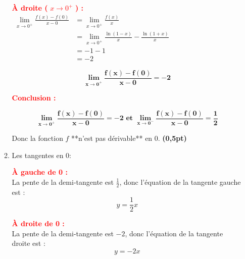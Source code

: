 \documentclass[12pt,a4paper]{article}
\begin{document}
\begin{enumerate}
\begin{enumerate}
                    \textcolor{red}{\textbf{À droite (} \( x \to 0^+ \) \textbf{) :}}\\

                    \(
                    \begin{aligned}
                        \lim\limits_{x \to 0^+} \frac{f(x)-f(0)}{x-0} & = \lim\limits_{x \to 0^+} \frac{f(x)}{x}                             \\
                                                                      & = \lim\limits_{x \to 0^+}\frac{\ln(1 - x)}{x} - \frac{\ln(1 + x)}{x} \\
                                                                      & =-1-1                                                                \\
                                                                      & =-2
                    \end{aligned}
                    \)

                    \begin{resultbox}
                        \[
                            \mathbf{\lim\limits_{x \to 0^+} \frac{f(x)-f(0)}{x-0}=-2}
                        \]
                    \end{resultbox}

                    \textcolor{red}{\textbf{Conclusion :}}\\

                    \begin{resultbox}
                        \[
                            \mathbf{\lim\limits_{x \to 0^+} \frac{f(x)-f(0)}{x-0}=-2 \text{ et } \lim\limits_{x \to 0^-} \frac{f(x)-f(0)}{x-0}=\frac{1}{2}}
                        \]
                    \end{resultbox}

                    Donc la fonction \( f \) **n’est pas dérivable** en 0. \hfill \textbf{(0,5pt)}

              \item Les tangentes en $0$:
              
                    \textcolor{red}{\textbf{À gauche de 0 :}}\\
                    La pente de la demi-tangente est \( \frac{1}{2} \), donc l'équation de la tangente gauche est :
                    \[
                        y = \frac{1}{2}x
                    \]

                    \textcolor{red}{\textbf{À droite de 0 :}}\\
                    La pente de la demi-tangente est \( -2 \), donc l'équation de la tangente droite est :
                    \[
                        y = -2x
                    \]


\end{enumerate}
\end{enumerate}
\end{document}
